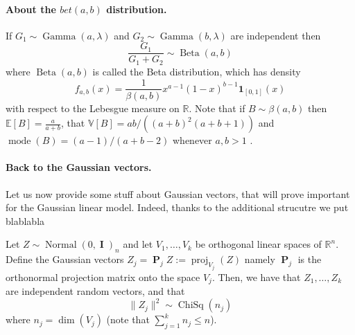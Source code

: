 \documentclass[
	fontsize=11pt, %
	twoside=false, %
	numbers=noenddot, %
]{kaobook}
\DeclareMathOperator{\bI}{\boldsymbol I}
\DeclareMathOperator{\bP}{\boldsymbol P}
\DeclareMathOperator{\mode}{mode}
\DeclareMathOperator{\bet}{Beta}
\DeclareMathOperator{\chisq}{ChiSq}
\DeclareMathOperator{\gam}{Gamma}
\DeclareMathOperator{\nor}{Normal}
\DeclareMathOperator{\proj}{proj}
\newcommand{\E}{\mathbb E}
\newcommand{\R}{\mathbb R}
\newcommand{\var}{\mathbb V}
\newcommand{\ind}[1]{\mathbf 1_{#1}}
\newcommand{\norm}[1]{\|#1\|}
\begin{document}
\paragraph{About the $bet(a, b)$ distribution.} %

If $G_1 \sim \gam(a, \lambda)$ and $G_2 \sim \gam(b, \lambda)$ are independent then
\begin{equation*}
	\frac{G_1}{G_1 + G_2} \sim \bet(a, b)
\end{equation*}
where $\bet(a, b)$ is called the Beta distribution, which has density
\begin{equation*}
	f_{a, b}(x) = \frac{1}{\beta(a, b)} x^{a - 1} (1 - x)^{b - 1} \ind{[0, 1]}(x)
\end{equation*}
with respect to the Lebesgue measure on $\R$. Note that if $B \sim \beta(a, b)$ then $\E[B] = \frac{a}{a + b}$, that $\var[B] = ab / ((a + b)^2 (a + b + 1))$ and $\mode(B) = (a - 1) / (a + b - 2)$ whenever $a, b > 1$ .


\paragraph{Back to the Gaussian vectors.}

Let us now provide some stuff about Gaussian vectors, that will prove important for the Gaussian linear model. Indeed, thanks to the additional strucutre we put blablabla

\begin{theorem}
	Let $Z \sim \nor(0, \bI)_n$ and let $V_1, \ldots, V_k$ be orthogonal linear spaces of $\R^n$. Define the Gaussian vectors $Z_j = \bP_j Z := \proj_{V_j}(Z)$ namely $\bP_j$ is the orthonormal projection matrix onto the space $V_j$. Then, we have that $Z_1, \ldots, Z_k$ are independent random vectors, and that
	\begin{equation}
		\norm{Z_j}^2 \sim \chisq(n_j)
	\end{equation}
	where $n_j = \dim(V_j)$ (note that $\sum_{j=1}^k n_j \leq n$).
\end{theorem}
\end{document}
